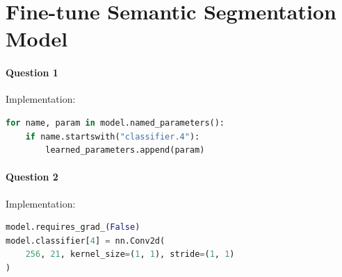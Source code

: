 \documentclass[12pt]{article}
\begin{document}
	\section{Fine-tune Semantic Segmentation Model}
	\paragraph{Question 1} Implementation:
	\begin{lstlisting}[language=python]
for name, param in model.named_parameters():
    if name.startswith("classifier.4"):
        learned_parameters.append(param)
	\end{lstlisting}
	\paragraph{Question 2} Implementation:
	\begin{lstlisting}[language=python]
model.requires_grad_(False)
model.classifier[4] = nn.Conv2d(
	256, 21, kernel_size=(1, 1), stride=(1, 1)
)
	\end{lstlisting}
	
\end{document}
